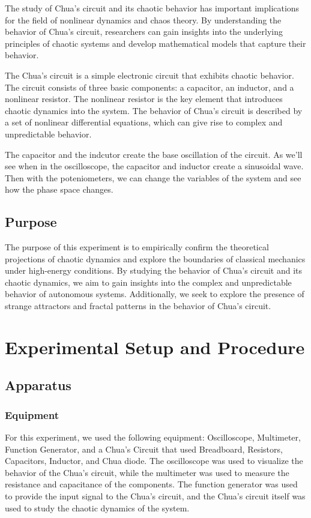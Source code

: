 \documentclass[12pt]{article}
\begin{document}
                The study of Chua's circuit and its chaotic behavior has important implications for the field of nonlinear
                dynamics and chaos theory. By understanding the behavior of Chua's circuit, researchers can gain insights
                into the underlying principles of chaotic systems and develop mathematical models that capture their behavior.

                The Chua's circuit is a simple electronic circuit that exhibits chaotic behavior. The circuit consists of
                three basic components: a capacitor, an inductor, and a nonlinear resistor. The nonlinear resistor is the
                key element that introduces chaotic dynamics into the system. The behavior of Chua's circuit is described
                by a set of nonlinear differential equations, which can give rise to complex and unpredictable behavior.

                The capacitor and the indcutor create the base oscillation of the circuit. As we'll see when in the oscilloscope,
                the capacitor and inductor create a sinusoidal wave. Then with the poteniometers, we can change the variables of the 
                system and see how the phase space changes.


        \subsection{Purpose}
                The purpose of this experiment is to empirically confirm the theoretical projections of chaotic dynamics and 
                explore the boundaries of classical mechanics under high-energy conditions. By studying the behavior of Chua's 
                circuit and its chaotic dynamics, we aim to gain insights into the complex and unpredictable behavior of 
                autonomous systems. Additionally, we seek to explore the presence of strange attractors and fractal patterns 
                in the behavior of Chua's circuit.

\section{Experimental Setup and Procedure}
        \subsection{Apparatus}
                \subsubsection{Equipment}
                For this experiment, we used the following equipment: Oscilloscope, Multimeter, Function Generator, and a Chua's Circuit that used Breadboard,
                Resistors, Capacitors, Inductor, and Chua diode. The oscilloscope was used to visualize the behavior of the Chua's circuit, 
                while the multimeter was used to measure the resistance and capacitance of the components. The function generator was used to 
                provide the input signal to the Chua's circuit, and the Chua's circuit itself was used to study the chaotic dynamics of the system.
                        
\end{document}
